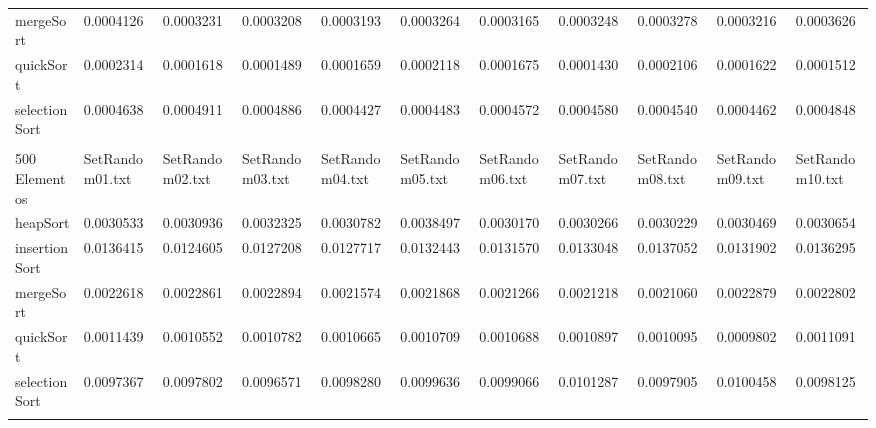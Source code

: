 \documentclass[article,a4paper]{article}
\begin{document}
\begin{table}[h]
{\begin{tabular}{lllllllllll}
mergeSort       & 0.0004126       & 0.0003231       & 0.0003208       & 0.0003193       & 0.0003264       & 0.0003165       & 0.0003248       & 0.0003278       & 0.0003216       & 0.0003626       \\
quickSort       & 0.0002314       & 0.0001618       & 0.0001489       & 0.0001659       & 0.0002118       & 0.0001675       & 0.0001430       & 0.0002106       & 0.0001622       & 0.0001512       \\
selectionSort   & 0.0004638       & 0.0004911       & 0.0004886       & 0.0004427       & 0.0004483       & 0.0004572       & 0.0004580       & 0.0004540       & 0.0004462       & 0.0004848       \\
                &                 &                 &                 &                 &                 &                 &                 &                 &                 &                 \\
500 Elementos   & SetRandom01.txt & SetRandom02.txt & SetRandom03.txt & SetRandom04.txt & SetRandom05.txt & SetRandom06.txt & SetRandom07.txt & SetRandom08.txt & SetRandom09.txt & SetRandom10.txt \\
heapSort        & 0.0030533       & 0.0030936       & 0.0032325       & 0.0030782       & 0.0038497       & 0.0030170       & 0.0030266       & 0.0030229       & 0.0030469       & 0.0030654       \\
insertionSort   & 0.0136415       & 0.0124605       & 0.0127208       & 0.0127717       & 0.0132443       & 0.0131570       & 0.0133048       & 0.0137052       & 0.0131902       & 0.0136295       \\
mergeSort       & 0.0022618       & 0.0022861       & 0.0022894       & 0.0021574       & 0.0021868       & 0.0021266       & 0.0021218       & 0.0021060       & 0.0022879       & 0.0022802       \\
quickSort       & 0.0011439       & 0.0010552       & 0.0010782       & 0.0010665       & 0.0010709       & 0.0010688       & 0.0010897       & 0.0010095       & 0.0009802       & 0.0011091       \\
selectionSort   & 0.0097367       & 0.0097802       & 0.0096571       & 0.0098280       & 0.0099636       & 0.0099066       & 0.0101287       & 0.0097905       & 0.0100458       & 0.0098125       \\
                &                 &                 &                 &                 &                 &                 &                 &                 &                 &                 \\

\end{tabular}}
\end{table}
\end{document}
